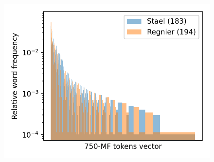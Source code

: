 \begin{figure}
  \label{fig:mf_vector_last_rl}
  \includegraphics[width=\linewidth]{img/mf_vector_last_rl.png}
\end{figure}
